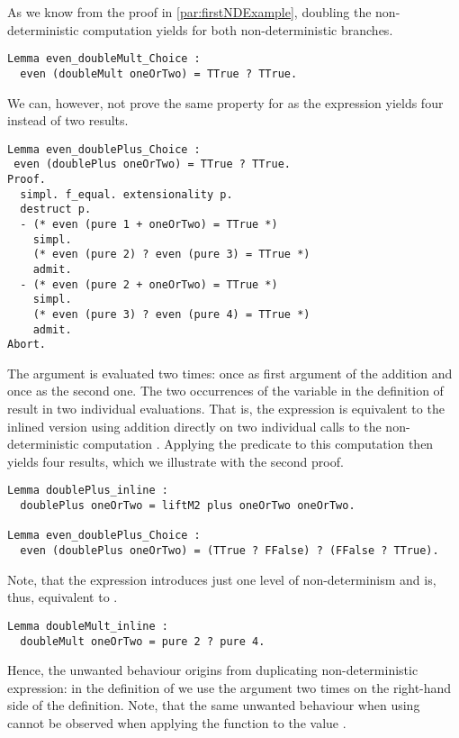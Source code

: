 As we know from the proof in \autoref{par:firstNDExample}, doubling the non-deterministic computation  yields  for both non-deterministic branches.

\begin{verbatim}
Lemma even_doubleMult_Choice :
  even (doubleMult oneOrTwo) = TTrue ? TTrue.
\end{verbatim}

We can, however, not prove the same property for  as the expression yields four instead of two results.

\begin{verbatim}
Lemma even_doublePlus_Choice :
 even (doublePlus oneOrTwo) = TTrue ? TTrue.
Proof.
  simpl. f_equal. extensionality p.
  destruct p.
  - (* even (pure 1 + oneOrTwo) = TTrue *)
    simpl.
    (* even (pure 2) ? even (pure 3) = TTrue *)
    admit.
  - (* even (pure 2 + oneOrTwo) = TTrue *)
    simpl.
    (* even (pure 3) ? even (pure 4) = TTrue *)
    admit.
Abort.
\end{verbatim}

The argument  is evaluated two times: once as first argument of the addition and once as the second one.
The two occurrences of the variable  in the definition of  result in two individual evaluations.
That is, the expression is equivalent to the inlined version using addition directly on two individual calls to the non-deterministic computation .
Applying the predicate  to this computation then yields four results, which we illustrate with the second proof.

\begin{verbatim}
Lemma doublePlus_inline :
  doublePlus oneOrTwo = liftM2 plus oneOrTwo oneOrTwo.

Lemma even_doublePlus_Choice :
  even (doublePlus oneOrTwo) = (TTrue ? FFalse) ? (FFalse ? TTrue).
\end{verbatim}

Note, that the expression  introduces just one level of non-determinism and is, thus, equivalent to .

\begin{verbatim}
Lemma doubleMult_inline :
  doubleMult oneOrTwo = pure 2 ? pure 4.
\end{verbatim}

Hence, the unwanted behaviour origins from duplicating non-deterministic expression: in the definition of  we use the argument  two times on the right-hand side of the definition.
Note, that the same unwanted behaviour when using  cannot be observed when applying the function to the value .

